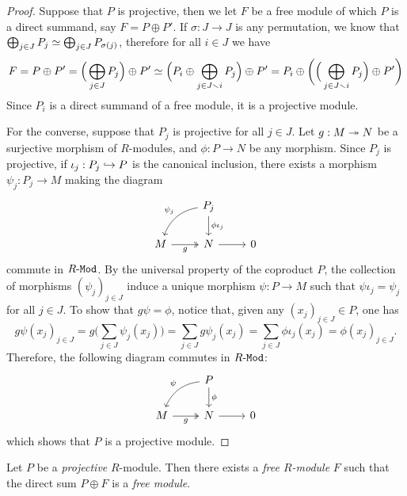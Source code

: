\begin{proof}
    Suppose that \(P\) is projective, then we let \(F\) be a free module of which
    \(P\) is a direct summand, say \(F = P \oplus P'\). If \(\sigma: J \to J\) is
    any permutation, we know that \(\bigoplus_{j \in J} P_j \simeq
    \bigoplus_{j \in J} P_{\sigma(j)}\), therefore for all \(i \in J\) we have
    \[
        F = P \oplus P' = \Big( \bigoplus_{j \in J} P_j \Big) \oplus P'
        \simeq \Big( P_i \oplus \bigoplus_{j \in J \smallsetminus i} P_j \Big) \oplus P'
        = P_i \oplus \bigg(\Big(\bigoplus_{j \in J \smallsetminus i} P_j \Big) \oplus P'\bigg)
    \]
    Since \(P_i\) is a direct summand of a free module, it is a projective module.

    For the converse, suppose that \(P_j\) is projective for all \(j \in J\). Let
    \(g: M \twoheadrightarrow N\) be a surjective morphism of \(R\)-modules, and \(\phi: P \to N\)
    be any morphism. Since \(P_j\) is projective, if \(\iota_j: P_j \hookrightarrow P\) is the
    canonical inclusion, there exists a morphism \(\psi_j: P_j \to M\) making the
    diagram
    \[
        \begin{tikzcd}
            &P_j \ar[d, "\phi \iota_j"] \ar[dl, bend right, "\psi_j"'] &\\
            M \ar[r, two heads, "g"'] &N \ar[r] &0
        \end{tikzcd}
    \]
    commute in \({R\text{-}\texttt{Mod}}\). By the universal property of the coproduct \(P\), the
    collection of morphisms \((\psi_j)_{j \in J}\) induce a unique morphism \(\psi:
    P \to M\) such that \(\psi \iota_j = \psi_j\) for all \(j \in J\). To show that
    \(g \psi = \phi\), notice that, given any \((x_j)_{j \in J} \in P\), one has
    \[
        g \psi(x_j)_{j \in J} = g \Big(\sum_{j \in J} \psi_j(x_j)\Big)
        = \sum_{j \in J} g \psi_j(x_j)
        = \sum_{j \in J} \phi \iota_j(x_j)
        = \phi(x_j)_{j \in J}.
    \]
    Therefore, the following diagram commutes in \({R\text{-}\texttt{Mod}}\):
    \[
        \begin{tikzcd}
            &P \ar[d, "\phi"] \ar[dl, bend right, "\psi"'] &\\
            M \ar[r, two heads, "g"'] &N \ar[r] &0
        \end{tikzcd}
    \]
    which shows that \(P\) is a projective module.
\end{proof}

\begin{proposition}
    \label{prop:eilenberg-trick}
    Let \(P\) be a \emph{projective} \(R\)-module. Then there exists a \emph{free
        \(R\)-module} \(F\) such that the direct sum \(P \oplus F\) is a \emph{free
        module}.
\end{proposition}

